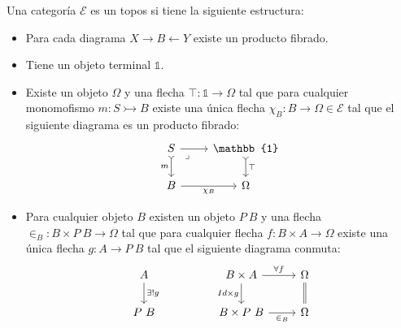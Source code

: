 \documentclass{article}
\begin{document}
\begin{definition}[Topos]
    Una categoría $\mathcal{E}$ es un topos si tiene la siguiente estructura:
    \begin{itemize}
        \item Para cada diagrama $X \rightarrow B \leftarrow Y$ existe un
              producto fibrado.
        \item Tiene un objeto terminal $\mathbb{1}$.
        \item Existe un objeto $\Omega$ y una flecha 
              $\top : \mathbb{1} \rightarrow \Omega$ tal que para cualquier 
              monomofismo $m : S \rightarrowtail B$ existe una única flecha
              $\chi_B: B \rightarrow \Omega \in \mathcal{E}$ tal que el siguiente
              diagrama es un producto fibrado:
        \[\begin{tikzcd}
	        S & \mathbb{1} \\
	        B & \Omega
	        \arrow["\top", tail, from=1-2, to=2-2]
	        \arrow["\chi_B"', from=2-1, to=2-2]
	        \arrow["m"', tail, from=1-1, to=2-1]
	        \arrow[from=1-1, to=1-2]
	        \arrow["\lrcorner"{anchor=center, pos=0.125}, draw=none, from=1-1, to=2-2]
        \end{tikzcd}\]
        \item Para cualquier objeto $B$ existen un objeto $P\ B$ y una flecha 
        $\in_B : B \times P\ B \rightarrow \Omega$ tal que para cualquier flecha
        $f : B \times A \rightarrow \Omega$ existe una única flecha 
        $g : A \rightarrow P\ B$ tal que el siguiente diagrama conmuta:
        \[\begin{tikzcd}
	        A && {B\times A} & \Omega \\
	        {P\ B} && {B \times P\ B} & \Omega
	        \arrow["{\exists! g}", from=1-1, to=2-1]
	        \arrow["{\forall f}", from=1-3, to=1-4]
	        \arrow["{\in_B}"', from=2-3, to=2-4]
	        \arrow["{Id\times g}"', from=1-3, to=2-3]
	        \arrow[Rightarrow, no head, from=1-4, to=2-4]
        \end{tikzcd}\]
    \end{itemize}
\end{definition}
\end{document}
